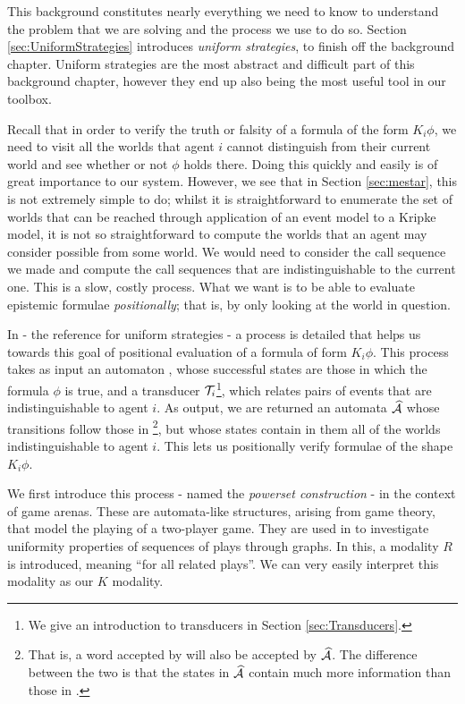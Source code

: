 \documentclass[10pt, a4paper]{report}
\begin{document}
This background constitutes nearly everything we need to know to understand the
problem that we are solving and the process we use to do so. Section
\ref{sec:UniformStrategies} introduces \emph{uniform strategies}, to finish off
the background chapter. Uniform strategies are the most abstract and difficult part of
this background chapter, however they end up also being the most useful tool in
our toolbox. 

Recall that in order to verify the truth or falsity of a formula of the form
$K_i \phi$, we need to visit all the worlds that agent $i$ cannot distinguish
from their current world and see whether or not $\phi$ holds there. Doing this
quickly and easily is of great importance to our system. However, we see that in
Section \ref{sec:mestar}, this is not extremely simple to do; whilst it is
straightforward to enumerate the set of worlds that can be reached through
application of an event model to a Kripke model, it is not so straightforward to
compute the worlds that an agent may consider possible from some world. We
would need to consider the call sequence we made and compute the call sequences
that are indistinguishable to the current one. This is a slow, costly process.
What we want is to be able to evaluate epistemic formulae \emph{positionally};
that is, by only looking at the world in question.

In \cite{UniformStrategies} - the reference for uniform strategies - a process
is detailed that helps us towards this goal of positional evaluation of a
formula of form $K_i \phi$. This process takes as input an automaton ,
whose successful states are those in which the formula $\phi$ is true, and a
transducer $\mathcal{T}_i$\footnote{We give an introduction to transducers in Section
  \ref{sec:Transducers}.}, which relates pairs of events that are
indistinguishable to agent $i$. As output, we are returned an automata
$\widehat{\mathcal{A}}$ whose transitions follow those in \footnote{That is,
  a word accepted by  will also be accepted by $\widehat{\mathcal{A}}$. The
  difference between the two is that the states in $\widehat{\mathcal{A}}$ contain
  much more information than those in .}, but whose states
contain in them all of the worlds indistinguishable to agent $i$. This lets us
positionally verify formulae of the shape $K_i \phi$.

We first introduce this process - named the \emph{powerset construction} - in
the context of game arenas. These are automata-like structures, arising from
game theory, that model the playing of a two-player game. They are used in
\cite{UniformStrategies} to investigate uniformity properties of sequences of
plays through graphs. In this, a modality $R$ is introduced, meaning ``for all
related plays''. We can very easily interpret this modality as our $K$ modality. 
\end{document}
